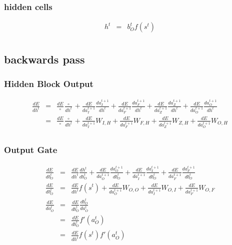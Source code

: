 \documentclass{article}
\begin{document}
\subsubsection{hidden cells}
\begin{eqnarray*}
h^t &=& b_{O}^t f(s^t) \\
\end{eqnarray*}


\subsection{backwards pass}

\subsubsection{Hidden Block Output}
\begin{eqnarray*}
\frac{dE}{dh^t} &=& \frac{dE}{ \circ }\frac{ \circ }{dh^t} + \frac{dE}{da_{I}^{t+1}}\frac{da_{I}^{t+1}}{dh^t} + \frac{dE}{da_{F}^{t+1}}\frac{da_{F}^{t+1}}{dh^{t}} + \frac{dE}{da_{Z}^{t+1}}\frac{da_{Z}^{t+1}}{dh^t} + \frac{dE}{da_{O}^{t+1}}\frac{da_{O}^{t+1}}{dh^t} \\
 &=& \frac{dE}{\circ}\frac{\circ}{dh^t} + \frac{dE}{da_{I}^{t+1}}W_{I,H} + \frac{dE}{da_{F}^{t+1}}W_{F,H} + \frac{dE}{da_{Z}^{t+1}}W_{Z,H} + \frac{dE}{da_{O}^{t+1}}W_{O,H} \\
\end{eqnarray*}

\subsubsection{Output Gate}
\begin{eqnarray*}
\frac{dE}{db_{O}^t} &=& \frac{dE}{dh^t}\frac{dh^t}{db_{O}^t} + \frac{dE}{da_{O}^{t+1}}\frac{da_{O}^{t+1}}{db_{O}^t} + \frac{dE}{da_{I}^{t+1}}\frac{da_{I}^{t+1}}{db_{O}^t}  + \frac{dE}{da_{F}^{t+1}}\frac{da_{F}^{t+1}}{db_{O}^t} \\
\frac{dE}{db_{O}^t} &=& \frac{dE}{dh^t}f(s^t) + \frac{dE}{da_{O}^{t+1}} W_{O,O} + \frac{dE}{da_{I}^{t+1}} W_{O,I} + \frac{dE}{da_{F}^{t+1}} W_{O,F} \\ 
\frac{dE}{da_{O}^t} &=& \frac{dE}{db_{O}^t}\frac{db_{O}^t}{da_{O}^t} \\
&=& \frac{dE}{db_{O}^t}f'(a_{O}^t) \\
&=& \frac{dE}{dh^t}f(s^t)f'(a_{O}^t) 
\end{eqnarray*}
\end{document}
